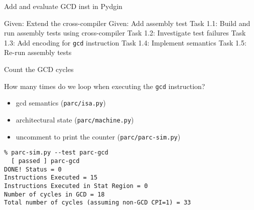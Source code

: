 
\begin{frame}{ Add and evaluate GCD inst in Pydgin}
\begin{cbxlist}
  \1 Given: Extend the cross-compiler
  \1 Given: Add assembly test
  \1 Task 1.1: Build and run assembly tests using cross-compiler
  \1 Task 1.2: Investigate test failures
  \1 Task 1.3: Add encoding for \texttt{gcd} instruction
  \1 Task 1.4: Implement semantics
  \1 Task 1.5: Re-run assembly tests
  \1 
  \1 
  \1 
\end{cbxlist}
\end{frame}


\begin{task}
\begin{frame}[fragile]{Count the GCD cycles}

{}How many times do we loop when executing the \texttt{gcd} instruction?

\begin{itemize}
  \item gcd semantics (\texttt{parc/isa.py})
  \item architectural state (\texttt{parc/machine.py})
  \item uncomment to print the counter (\texttt{parc/parc-sim.py})
\end{itemize}

\begin{Verbatim}[commandchars=\\\{\}]
% cd \midtilde/pydgin-tut/parc/asm_tests/build
% parc-sim.py --test parc-gcd
  [ passed ] parc-gcd
DONE! Status = 0
Instructions Executed = 15
Instructions Executed in Stat Region = 0
Number of cycles in GCD = 18
Total number of cycles (assuming non-GCD CPI=1) = 33
\end{Verbatim}

\end{frame}
\end{task}


